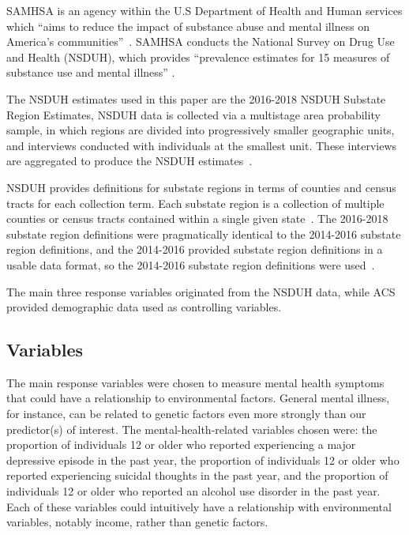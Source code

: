 \documentclass{article}
\begin{document}
SAMHSA is an agency within
the U.S Department of Health and Human services which
``aims to reduce the impact of substance abuse and mental
illness on America's communities''~\cite{samhsa_about_us}.
SAMHSA conducts
the National Survey on Drug Use and Health (NSDUH),
which provides
``prevalence estimates for 15 measures of substance use and mental illness''
\cite{samhsa_data}.

The NSDUH estimates used in this paper are the
2016-2018 NSDUH Substate Region Estimates,
NSDUH data is collected via a multistage area probability sample,
in which regions are divided
into progressively smaller geographic units,
and interviews conducted with individuals at the smallest unit.
These interviews are aggregated to produce the NSDUH
estimates~\cite{nsduh_description}.

NSDUH provides definitions for substate regions in terms of
counties and census tracts for each collection term.
Each substate region is a collection of multiple
counties or census tracts contained within a single
given state~\cite{samhsa_substate_region_defs}.
The 2016-2018 substate region definitions were
pragmatically identical to the 2014-2016 substate region definitions,
and the 2014-2016 provided substate region definitions in a
usable data format, so the 2014-2016 substate region definitions
were used~\cite{samhsa_substate_region_defs}.

The main three response variables originated from the
NSDUH data, while ACS provided demographic data used as controlling variables.

\subsection{Variables}\label{sec:finalvars}

The main response variables were chosen to measure mental health
symptoms that could have a relationship to environmental factors.
General mental illness, for instance, can be related to genetic factors
even more strongly than our predictor(s) of interest. The
mental-health-related variables chosen were: the proportion of individuals 12
or older who reported experiencing a major depressive episode in the
past year, the proportion of individuals 12 or older who reported
experiencing suicidal thoughts in the past year, and the proportion of
individuals 12 or older who reported an alcohol use disorder in the past
year. Each of these variables could intuitively have a relationship with
environmental variables, notably income, rather than genetic factors.
\end{document}
